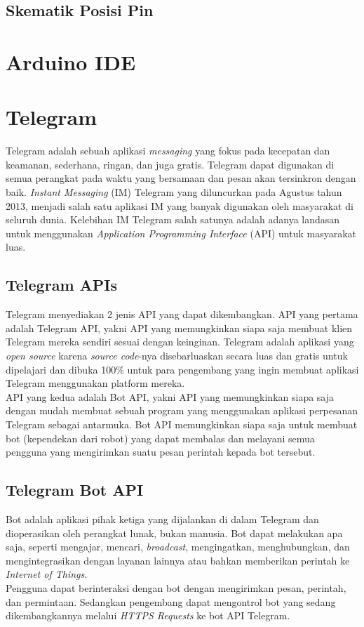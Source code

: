 \subsection{Skematik Posisi Pin}


\section{Arduino IDE}





\section{Telegram}
\tab Telegram adalah sebuah aplikasi \textit{messaging} yang fokus pada kecepatan dan keamanan, sederhana, ringan, dan juga gratis. Telegram dapat digunakan di semua perangkat pada waktu yang bersamaan dan pesan akan tersinkron dengan baik. \textit{Instant Messaging} (IM) Telegram yang diluncurkan pada Agustus tahun 2013, menjadi salah satu aplikasi IM yang banyak digunakan oleh masyarakat di seluruh dunia. Kelebihan
IM Telegram salah satunya adalah adanya landasan untuk
menggunakan \textit{Application Programming Interface} (API) untuk
masyarakat luas.

\subsection{Telegram APIs}
\tab Telegram menyediakan 2 jenis API yang dapat dikembangkan. API yang pertama adalah Telegram API, yakni API yang memungkinkan siapa saja membuat klien Telegram mereka sendiri sesuai dengan keinginan. Telegram adalah aplikasi yang \textit{open source} karena \textit{source code}-nya disebarluaskan secara luas dan gratis untuk dipelajari dan dibuka 100\% untuk para pengembang yang ingin membuat aplikasi Telegram menggunakan platform mereka. \\
\tab API yang kedua adalah Bot API, yakni API yang memungkinkan siapa saja dengan mudah membuat sebuah program yang menggunakan aplikasi perpesanan Telegram sebagai antarmuka. Bot API memungkinkan siapa saja untuk membuat bot (kependekan dari robot) yang dapat membalas dan melayani semua pengguna yang mengirimkan suatu pesan perintah kepada bot tersebut.
\subsection{Telegram Bot API}
\tab Bot adalah aplikasi pihak ketiga yang dijalankan di dalam Telegram dan dioperasikan oleh perangkat lunak, bukan manusia. Bot dapat melakukan apa saja, seperti mengajar, mencari, \textit{broadcast}, mengingatkan, menghubungkan, dan mengintegrasikan dengan layanan lainnya atau bahkan memberikan perintah ke \textit{Internet of Things}.\\
\tab Pengguna dapat berinteraksi dengan bot dengan mengirimkan pesan, perintah, dan permintaan. Sedangkan pengembang dapat mengontrol bot yang sedang dikembangkannya melalui \textit{HTTPS Requests} ke bot API Telegram. 


\cleardoublepage
